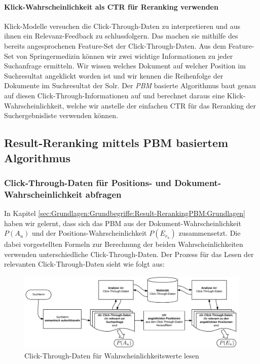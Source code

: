 \paragraph{Klick-Wahrscheinlichkeit als CTR für Reranking verwenden} 
Klick-Modelle versuchen die Click-Through-Daten zu interpretieren und aus ihnen ein Relevanz-Feedback zu schlussfolgern. Das machen sie mithilfe des bereits angesprochenen Feature-Set der Click-Through-Daten. Aus dem Feature-Set von Springermedizin können wir zwei wichtige Informationen zu jeder Suchanfrage ermitteln. Wir wissen welches Dokument auf welcher Position im Suchresultat angeklickt worden ist und wir kennen die Reihenfolge der Dokumente im Suchresultat der Solr. Der \textit{PBM} basierte Algorithmus baut genau auf diesen Click-Through-Informationen auf und berechnet daraus eine Klick-Wahrscheinlichkeit, welche wir anstelle der einfachen CTR für das Reranking der Suchergebnisliste verwenden können. 

\subsection{Result-Reranking mittels PBM basiertem Algorithmus}
\label{sec:Reranking:Methodik:Result-RerankingPBM}

\subsubsection{Click-Through-Daten für Positions- und Dokument-Wahrscheinlichkeit abfragen}
\label{sec:Reranking:Methodik:Result-RerankingPBM:PositionDokumentWahrscheinlichkeiten}

In Kapitel \ref{sec:Grundlagen:Grundbegriffe:Result-RerankingPBM:Grundlagen} haben wir gelernt, dass sich das PBM aus der Dokument-Wahrscheinlichkeit $P(A_{u})$ und der Positions-Wahrscheinlichkeit $P(E_{r_u})$ zusammensetzt. Die dabei vorgestellten Formeln zur Berechnung der beiden Wahrscheinlichkeiten verwenden unterschiedliche Click-Through-Daten. Der Prozess für das Lesen der relevanten Click-Through-Daten sieht wie folgt aus:

\begin{figure}[H]
\centering
\vspace{-1em}
\caption[Click-Through-Daten für Wahrscheinlichkeitswerte lesen]{Click-Through-Daten für Wahrscheinlichkeitswerte lesen}
\label{fig:WahrscheinlichkeitswerteCTDaten}
\includegraphics[width=\linewidth]{gfx/WahrscheinlichkeitswerteCTDaten}
\vspace{-2.5em}
\end{figure}

